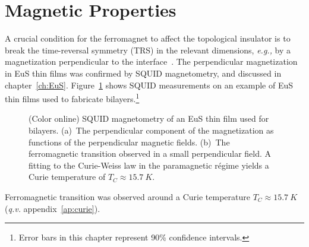 \section{Magnetic Properties}\label{sec:bl2014_mag}
A crucial condition for the ferromagnet to affect the topological insulator is to break the time-reversal symmetry (TRS) in the relevant dimensions, \textit{e.g.,} by a magnetization perpendicular to the interface~\cite{TI_Col, QAH_TI_Yu, MnSe}. The perpendicular magnetization in EuS thin films was confirmed by SQUID magnetometry, and discussed in chapter~\ref{ch:EuS}. Figure~\ref{fig:bl2014_squid} shows SQUID measurements on an example of EuS thin films used to fabricate bilayers.\footnote{Error bars in this chapter represent 90\% confidence intervals.}%
%
\begin{figure}[ht]%
    \centering%
    \caption[SQUID magnetometry of an EuS thin film used for bilayers]{\label{fig:bl2014_squid}(Color online) SQUID magnetometry of an EuS thin film used for bilayers. (a)~The perpendicular component of the magnetization as functions of the perpendicular magnetic fields. (b)~The ferromagnetic transition observed in a small perpendicular field. A fitting to the Curie-Weiss law in the paramagnetic r\'egime yields a Curie temperature of $T_C \approx \SI{15.7}{K}$.}%
\end{figure} %
%
Ferromagnetic transition was observed around a Curie temperature $T_C \approx \SI{15.7}{K}$ (\textit{q.v.} appendix~\ref{ap:curie}).

